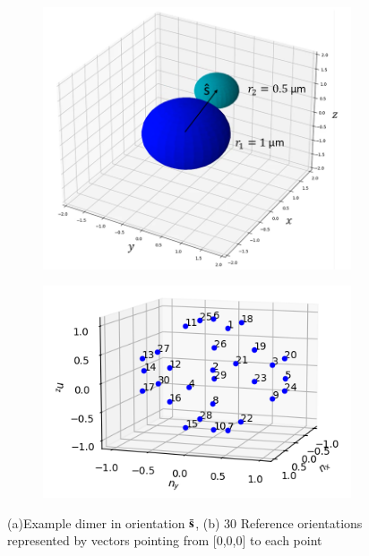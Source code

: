 \documentclass[final,  3p]{elsarticle}
\begin{document}
\begin{figure}[h]
	\centering
	\begin{subfigure}{0.49\textwidth}
		\subcaption{}
		\includegraphics[width=\textwidth]{./Images/fig2a.png}
	\end{subfigure}
	\begin{subfigure}{0.49\textwidth}
		\subcaption{}
		\includegraphics[width=\textwidth]{./Images/fig2b.png}
	\end{subfigure}
	\caption{(a)Example dimer in orientation $\bar{\bf s}$, (b) 30 Reference orientations represented by vectors pointing from [0,0,0] to each point}
	\label{fig:dimer}
\end{figure}
\end{document}
